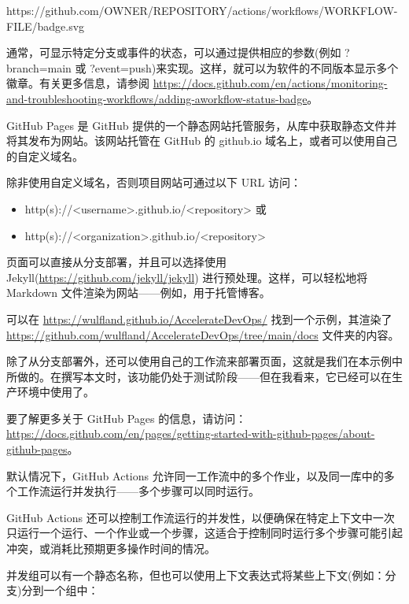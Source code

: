 \begin{shell}
https://github.com/OWNER/REPOSITORY/actions/workflows/WORKFLOW-FILE/badge.svg
\end{shell}

通常，可显示特定分支或事件的状态，可以通过提供相应的参数(例如 ?branch=main 或 ?event=push)来实现。这样，就可以为软件的不同版本显示多个徽章。有关更多信息，请参阅 \url{ https://docs.github.com/en/actions/monitoring-and-troubleshooting-workflows/adding-aworkflow-status-badge}。


GitHub Pages 是 GitHub 提供的一个静态网站托管服务，从库中获取静态文件并将其发布为网站。该网站托管在 GitHub 的 github.io 域名上，或者可以使用自己的自定义域名。

除非使用自定义域名，否则项目网站可通过以下 URL 访问：

\begin{itemize}
\item 
http(s)://<username>.github.io/<repository> 或

\item 
http(s)://<organization>.github.io/<repository>
\end{itemize}

页面可以直接从分支部署，并且可以选择使用 Jekyll(\url{https://github.com/jekyll/jekyll}) 进行预处理。这样，可以轻松地将 Markdown 文件渲染为网站——例如，用于托管博客。

可以在 \url{https://wulfland.github.io/AccelerateDevOps/} 找到一个示例，其渲染了 \url{https://github.com/wulfland/AccelerateDevOps/tree/main/docs} 文件夹的内容。

除了从分支部署外，还可以使用自己的工作流来部署页面，这就是我们在本示例中所做的。在撰写本文时，该功能仍处于测试阶段——但在我看来，它已经可以在生产环境中使用了。

要了解更多关于 GitHub Pages 的信息，请访问：\url{https://docs.github.com/en/pages/getting-started-with-github-pages/about-github-pages}。


默认情况下，GitHub Actions 允许同一工作流中的多个作业，以及同一库中的多个工作流运行并发执行——多个步骤可以同时运行。

GitHub Actions 还可以控制工作流运行的并发性，以便确保在特定上下文中一次只运行一个运行、一个作业或一个步骤，这适合于控制同时运行多个步骤可能引起冲突，或消耗比预期更多操作时间的情况。

并发组可以有一个静态名称，但也可以使用上下文表达式将某些上下文(例如：分支)分到一个组中：

